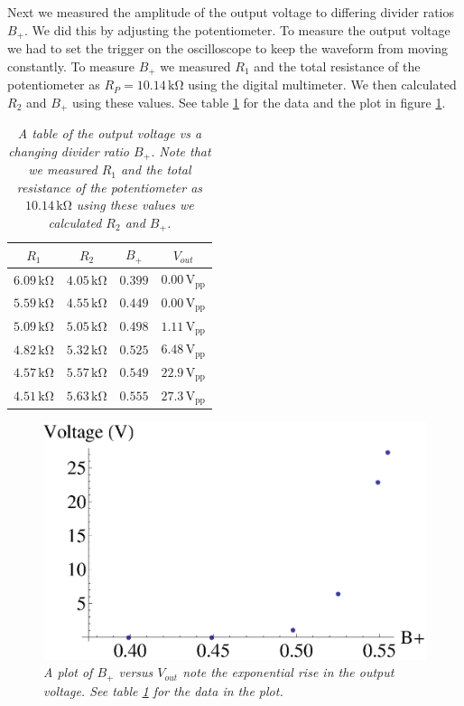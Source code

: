 \documentclass[11pt]{article}
\numberwithin{equation}{section}
\numberwithin{figure}{section}
\numberwithin{table}{section}
\newcommand{\unit}[1]{\ensuremath{\, \mathrm{#1}}}
\begin{document}
Next we measured the amplitude of the output voltage to differing divider ratios $B_+$. We did this by adjusting the potentiometer. To measure the output voltage we had to set the trigger on the oscilloscope to keep the waveform from moving constantly. To measure $B_+$ we measured $R_1$ and the total resistance of the potentiometer as $R_P = 10.14\unit{k\Omega}$ using the digital multimeter. We then calculated $R_2$ and $B_+$ using these values. See table \ref{TabOsc} for the data and the plot in figure \ref{PlotOsc}.
\begin{table}[h]
\centering
\begin{tabular}{cccc}
$R_1$			&$R_2$			&$B_+$		&$V_{out}$\\
\hline
$6.09\unit{k\Omega}$	&$4.05\unit{k\Omega}$	&$0.399$	&$0.00\unit{V_{pp}}$\\
$5.59\unit{k\Omega}$	&$4.55\unit{k\Omega}$	&$0.449$	&$0.00\unit{V_{pp}}$\\
$5.09\unit{k\Omega}$	&$5.05\unit{k\Omega}$	&$0.498$	&$1.11\unit{V_{pp}}$\\
$4.82\unit{k\Omega}$	&$5.32\unit{k\Omega}$	&$0.525$	&$6.48\unit{V_{pp}}$\\
$4.57\unit{k\Omega}$	&$5.57\unit{k\Omega}$	&$0.549$	&$22.9\unit{V_{pp}}$\\
$4.51\unit{k\Omega}$	&$5.63\unit{k\Omega}$	&$0.555$	&$27.3\unit{V_{pp}}$\\
\end{tabular}
\caption{\textit{A table of the output voltage vs a changing divider ratio $B_+$. Note that we measured $R_1$ and the total resistance of the potentiometer as $10.14\unit{k\Omega}$ using these values we calculated $R_2$ and $B_+$.}}
\label{TabOsc}
\end{table}
\begin{figure}[h]
\centering
\includegraphics[scale=0.70]{PlotOsc.eps}
\caption{\textit{A plot of $B_+$ versus $V_{out}$ note the exponential rise in the output voltage. See table \ref{TabOsc} for the data in the plot.}}
\label{PlotOsc}
\end{figure}
\end{document}
